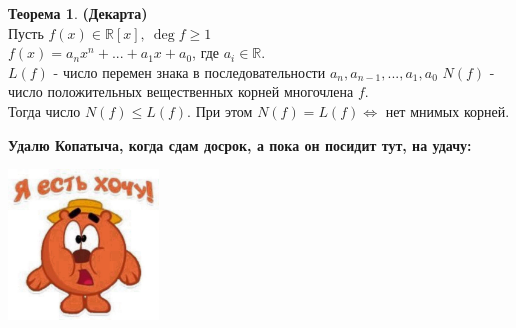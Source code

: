 \documentclass[a4paper, 12pt]{article}
\newcommand{\R}{\mathbb R}
\theoremstyle{definition}
\newtheorem*{theorem}{Теорема}
\begin{document}
  \begin{theorem} \textbf{(Декарта)}\\ 
    Пусть $f(x) \in \R [x], \ \deg f \geq 1$\\
    $f(x) = a_nx^n + ... + a_1x + a_0$, где $a_i \in \R.$\\
    $L(f)$ - число перемен знака в последовательности $a_n, a_{n-1},...,a_1,a_0$ $N(f)$ - число положительных вещественных корней многочлена $f$.\\
    Тогда число $N(f) \leq L(f)$. При этом $N(f) = L(f) \Longleftrightarrow $ нет мнимых корней.   
  \end{theorem}  
  \textbf{Удалю Копатыча, когда сдам досрок, а пока он посидит тут, на удачу:}
  \begin{center}
    \includegraphics[width=4cm]{daaa.jpg}
  \end{center}
  


\end{document}

